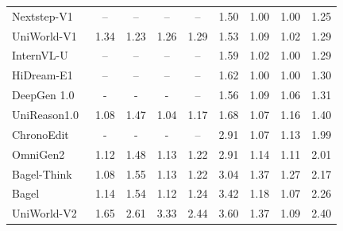 \documentclass{llmxive}
\begin{document}
\begin{table}[t]
{\begin{tabular}{l|cccc|cccc}
            Nextstep-V1~\cite{han2025nextstep}
            & -- & -- & -- & --
            & 1.50 & 1.00 & 1.00
            & \cellcolor[HTML]{C8C8C8}1.25 \\

            UniWorld-V1~\cite{lin2025uniworld}
            & 1.34 & 1.23 & 1.26 & \cellcolor[HTML]{C8C8C8}1.29 & 1.53 & 1.09 & 1.02
            & \cellcolor[HTML]{C8C8C8}1.29 \\

            InternVL-U~\cite{tian2026internvl}
            & -- & -- & -- & --
            & 1.59 & 1.02 & 1.00
            & \cellcolor[HTML]{C8C8C8}1.29 \\

            

            HiDream-E1~\cite{cai2025hidream}
            & -- & -- & -- & --
            & 1.62 & 1.00 & 1.00
            & \cellcolor[HTML]{C8C8C8}1.30 \\

            DeepGen 1.0~\cite{wang2026deepgen}
            & - & - & - & --
            & 1.56 & 1.09 & 1.06
            & \cellcolor[HTML]{C8C8C8}1.31 \\

            UniReason1.0~\cite{wang2026unireason}
            & 1.08 & 1.47 & 1.04 & \cellcolor[HTML]{C8C8C8}1.17 & 1.68 & 1.07 & 1.16
            & \cellcolor[HTML]{C8C8C8}1.40 \\

            ChronoEdit~\cite{wu2025chronoedit}
            & - & - & - & --
            & 2.91 & 1.07 & 1.13
            & \cellcolor[HTML]{C8C8C8}1.99 \\

            OmniGen2~\cite{wu2025omnigen2}
            & 1.12 & 1.48 & 1.13 & \cellcolor[HTML]{C8C8C8}1.22 & 2.91 & 1.14 & 1.11
            & \cellcolor[HTML]{C8C8C8}2.01 \\


            Bagel-Think~\cite{deng2025emerging}
            & 1.08 & 1.55 & 1.13 & \cellcolor[HTML]{C8C8C8}1.22 & 3.04 & 1.37 & 1.27
            & \cellcolor[HTML]{C8C8C8}2.17 \\

            Bagel~\cite{deng2025emerging}
            & 1.14 & 1.54 & 1.12 & \cellcolor[HTML]{C8C8C8}1.24 & 3.42 & 1.18 & 1.07 
            & \cellcolor[HTML]{C8C8C8}2.26 \\

            UniWorld-V2~\cite{li2025uniworld}
            & 1.65 & 2.61 & 3.33 & \cellcolor[HTML]{C8C8C8}2.44 & 3.60 & 1.37 & 1.09
            & \cellcolor[HTML]{C8C8C8}2.40 \\


\end{tabular}}
\end{table}
\end{document}
